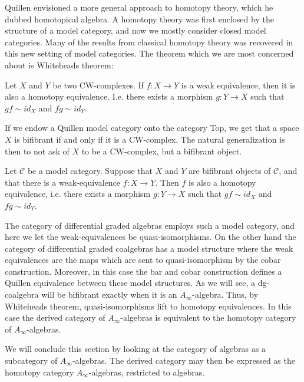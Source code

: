 \documentclass[../thesis.tex]{subfiles}
\begin{document}
        Quillen envisioned a more general approach to homotopy theory, which he dubbed homotopical algebra. A homotopy theory was first enclosed by the structure of a model category, and now we mostly consider closed model categories. Many of the results from classical homotopy theory was recovered in this new setting of model categories. The theorem which we are most concerned about is Whiteheads theorem:

        \begin{thm}
            Let $X$ and $Y$ be two CW-complexes. If $f:X\rightarrow Y$ is a weak equivalence, then it is also a homotopy equivalence. I.e. there exists a morphism $g: Y\rightarrow X$ such that $gf\sim id_X$ and $fg\sim id_Y$.
        \end{thm}

        If we endow a Quillen model category onto the category Top, we get that a space $X$ is bifibrant if and only if it is a CW-complex. The natural generalization is then to not ask of $X$ to be a CW-complex, but a bifibrant object.

        \begin{thm}
            Let $\mathcal{C}$ be a model category. Suppose that $X$ and $Y$ are bifibrant objects of $\mathcal{C}$, and that there is a weak-equivalence $f:X\rightarrow Y$. Then $f$ is also a homotopy equivalence, i.e. there exists a morphism $g: Y\rightarrow X$ such that $gf\sim id_X$ and $fg\sim id_Y$.
        \end{thm}

        The category of differential graded algebras employs such a model category, and here we let the weak-equivalences be quasi-isomorphisms. On the other hand the category of differential graded coalgebras has a model structure where the weak equivalences are the maps which are sent to quasi-isomorphism by the cobar construction. Moreover, in this case the bar and cobar construction defines a Quillen equivalence between these model structures. As we will see, a dg-coalgebra will be bifibrant exactly when it is an $A_\infty$-algebra. Thus, by Whiteheads theorem, quasi-isomorphisms lift to homotopy equivalences. In this case the derived category of $A_\infty$-algebras is equivalent to the homotopy category of $A_\infty$-algebras.

        We will conclude this section by looking at the category of algebras as a subcategory of $A_\infty$-algebras. The derived category may then be expressed as the homotopy category $A_\infty$-algebras, restricted to algebras.
\end{document}
